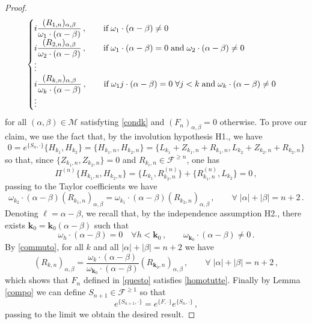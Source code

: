 \documentclass[10pt,a4paper]{amsart}
\newcommand{\al}{{\alpha}}
\newcommand{\bt}{{\beta}}
\newcommand{\cF}{{\mathcal F}}
\newcommand{\cM}{{\mathcal M}}
\newcommand{\im}{{\rm i}}
\begin{document}
\begin{proof}
\begin{equation}
\begin{cases}
			\im \dfrac{(R_{1,n})_{\al,\bt}}{\omega_1 \cdot (\al-\bt)}\,,\qquad \mbox{if}\;  \omega_1 \cdot (\al-\bt)\neq 0\\
			\im 	\dfrac{(R_{2,n})_{\al,\bt}}{\omega_2 \cdot (\al-\bt)}\,,\qquad \mbox{if}\;  \omega_1 \cdot (\al-\bt)=0 \;\mbox{and}\;   \omega_2 \cdot (\al-\bt)\neq 0\\
			\vdots
			\\
			\im 	\dfrac{(R_{k,n})_{\al,\bt}}{\omega_k \cdot (\al-\bt)}\,,\qquad \mbox{if}\;  \omega_1j\cdot (\al-\bt)=0 \; \forall j< k \;\mbox{and}\;   \omega_k \cdot (\al-\bt)\neq 0\\
			\vdots
		\end{cases}
	\end{equation}
	for all $(\al,\bt) \in \cM$ satisfyting \eqref{condk} and  $(F_n)_{\al,\bt}=0$ otherwise.
	To prove our claim, we use the fact that, by the involution hypothesis H1., we have 
	\[
	0= e^{\{S_n,\cdot \}} \{H_{k_1},H_{k_2}\}= \{H_{k_1,n},H_{k_2,n}\}=\{ L_{k_1}  + Z_{k_1,n}+ R_{k_1,n},L_{k_2}  + Z_{k_2,n}+ R_{k_2,n}\}
	\]
	so that, since $\{Z_{k_1,n},Z_{k_2,n}\}=0$ and $R_{k_i,n} \in \cF^{\geq n}$, one has 
	\[
	\Pi^{(n)} \{H_{k_1,n},H_{k_2,n}\} =\{L_{k_1}, R_{k_2,n}^{(n)}\} + \{R_{k_1,n}^{(n)}, L_{k_2}\}=0\,,
	\]
	passing to the Taylor coefficients we have
	\begin{equation}
		\label{commuto}
		\omega_{k_2} \cdot (\al-\bt) (R_{k_1,n})_{\al,\bt} = \omega_{k_1} \cdot (\al-\bt) (R_{k_2,n})_{\al,\bt} \,,\qquad \forall \; |\al|+|\bt| = n+2\,.
	\end{equation}
	Denoting $\ell= \al-\bt$, we recall that, by the independence assumption H2., there exists ${\mathbf k}_0 = {\mathbf k}_0(\al-\bt)$ such that
	\[
	\omega_{h} \cdot (\al-\bt) =0\quad  \forall h< {\mathbf k}_0\,,\qquad  \omega_{{\mathbf k}_0}\cdot (\al-\bt) \neq 0\,.
	\]
	By \eqref{commuto}, for all $k$ and all $ |\al|+|\bt| = n+2$ we have
	\[
	(R_{k,n})_{\al,\bt} =%
	\frac{\omega_{k} \cdot (\al-\bt)}{\omega_{{\mathbf k}_0}\cdot (\al-\bt)} (R_{{\mathbf k}_0,n})_{\al,\bt} \,,\qquad \forall \; |\al|+|\bt| = n+2\,,
	\]
	which shows that $F_n$ defined in \eqref{questo} satisfies \eqref{homotutte}.
	Finally by Lemma \ref{compo} we can define $S_{n+1}\in \cF^{\geq 1}$ so that
	\[
	e^{\{S_{n+1},\cdot\}}= e^{\{F,\cdot \} }e^{\{S_n,\cdot\}}\,,
	\]
	passing to the limit we obtain the desired result.
\end{proof}
\end{document}
